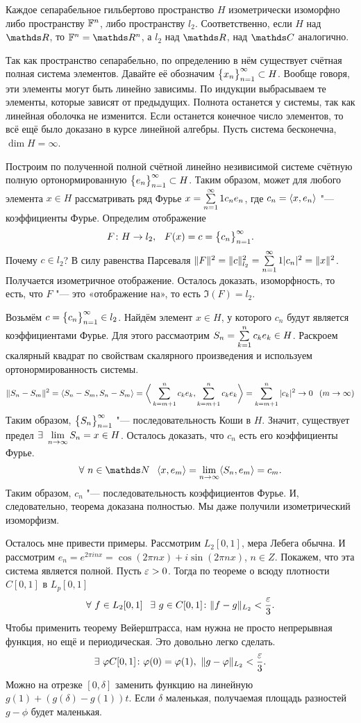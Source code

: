 \begin{The}
	Каждое сепарабельное гильбертово пространство $H$ изометрически изоморфно либо пространству $\mathbb F^n$, либо пространству $l_2$. Соответственно, если $H$ над $\R$, то $\F^n = \R^n$, а $l_2$ над $\R$, над $\C$ аналогично.
\end{The}
\begin{Proof}
	Так как пространство сепарабельно, по определению в нём существует счётная полная система элементов. Давайте её обозначим $\big\{{x}_{n}\big\}_{n=1}^\infty\subset H$. Вообще говоря, эти элементы могут быть линейно зависимы. По индукции выбрасываем те элементы, которые зависят от предыдущих. Полнота останется у системы, так как линейная оболочка не изменится. Если останется конечное число элементов, то всё ещё было доказано в курсе линейной алгебры. Пусть система бесконечна, $\dim H = \infty$.

	Построим по полученной полной счётной линейно незивисимой системе счётную полную ортонормированную $\big\{{e}_{n}\big\}_{n=1}^\infty\subset H$. Таким образом, может для любого элемента $x\in H$ рассматривать ряд Фурье $ x = \sum\limits_{{n}={1}}^\infty1 c_n e_n$, где $c_n = \langle x,e_n\rangle$ "--- коэффициенты Фурье. Определим отображение
\[
		F\colon H\to l_2,\pau F(x) = c = \pos c.
	\]
	Почему $c\in l_2$? В силу равенства Парсеваля $\|F\|^2 = \|c\|^2_{l_2} = \sum\limits_{{n}={1}}^\infty1|c_n|^2 = \|x\|^2$. Получается изометричное отображение. Осталось доказать, изоморфность, то есть, что $F$ "--- это «отображение на», то есть $\Im(F) = l_2$.

Возьмём $c = \big\{{c}_{n}\big\}_{n=1}^\infty\in l_2$. Найдём элемент $x\in H$, у которого $c_n$ будут является коэффициентами Фурье. Для этого рассмаотрим $S_n = \sum\limits_{k = 1}^{n} c_k e_k\in H$. Раскроем скалярный квадрат по свойствам скалярного произведения и используем ортонормированность системы.
\[
	\|S_n-S_m\|^2 = \langle S_n-S_m,S_n-S_m\rangle = \bigg\langle\sum\limits_{k = m+1}^{n}c_ke_k,\sum\limits_{k = m+1}^{n}c_ke_k\bigg\rangle = \sum\limits_{k = m+1}^{n}|c_k|^2\rightarrow 0\hskip .75em plus.1em minus.08em\relax (m\rightarrow\infty)
\]
Таким образом, $\big\{{S}_{n}\big\}_{n=1}^\infty$ "--- последовательность Коши в $H$. Значит, существует предел $\exists\ \lim\limits_{n\rightarrow\infty} S_n = x\in H$. Осталось доказать, что $c_n$ есть его коэффициенты Фурье.
\[
	\forall\ n\in\N\pau \la x,e_m\ra =\yo n\infty\la S_n,e_m\ra = c_m.
\]
Таким образом, $c_n$ "--- последовательность коэффициентов Фурье. И, следовательно, теорема доказана полностью. Мы даже получили изометрический изоморфизм.
\end{Proof}

Осталось мне привести примеры. Рассмотрим $L_2[0,1]$, мера Лебега обычна. И рассмотрим $e_n = e^{2\pi i nx} = \cos(2\pi nx) + i\sin (2\pi nx)$, $n\in Z$. Покажем, что эта система является полной. Пусть $\varepsilon>0$. Тогда по теореме о всюду плотности $C[0,1]$ в $L_p[0,1]$
\[
	\forall\ f\in L_2[0,1]\hskip .75em plus.1em minus.08em\relax \exists\ g\in C[0,1]\colon \|f-g\|_{L_2}<\frac{\varepsilon}3.
\]
Чтобы применить теорему Вейерштрасса, нам нужна не просто непрерывная функция, но ещё и периодическая. Это довольно легко сделать.
\[
	\exists\ \phi C[0,1]\colon \phi(0) = \phi(1),\ \|g - \phi\|_{L_2}<\frac\e3.
\]
Можно на отрезке $[0,\delta]$ заменить функцию на линейную $g(1) + (g(\delta) - g(1))t$. Если $\delta$ маленькая, получаемая площадь разностей $g-\phi$ будет маленькая.

